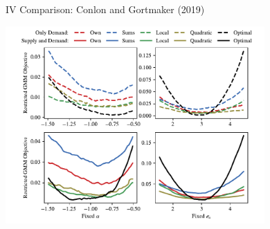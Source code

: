 \documentclass[xcolor=pdftex,dvipsnames,table,mathserif,aspectratio=169]{beamer}
\begin{document}
\begin{frame}{IV Comparison: Conlon and Gortmaker (2019)}
\begin{center}
\includegraphics[width=3.9in]{resources/fixed_parameters_simple_plot.pdf}
\end{center}
\end{frame}
\end{document}
